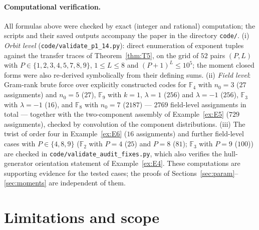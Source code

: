 \documentclass[10pt,journal,draftclsnofoot,onecolumn]{IEEEtran}
\theoremstyle{definition}
\theoremstyle{remark}
\begin{document}
\paragraph{Computational verification.}
All formulas above were checked by exact (integer and rational)
computation; the scripts and their saved outputs accompany the paper in
the directory \texttt{code/}. (i) \emph{Orbit level}
(\texttt{code/validate\_p1\_14.py}): direct enumeration of exponent
tuples against the transfer traces of Theorem~\ref{thm:T5}, on the grid
of \(52\) pairs \((P,L)\) with \(P \in \{1,2,3,4,5,7,8,9\}\),
\(1 \le L \le 8\) and \((P+1)^L \le 10^5\); the moment closed forms were
also re-derived symbolically from their defining sums. (ii) \emph{Field
level}: Gram-rank brute force over explicitly constructed codes for
\(\mathbb{F}_4\) with \(n_0 = 3\) (\(27\) assignments) and \(n_0 = 5\)
(\(27\)), \(\mathbb{F}_9\) with \(k = 1\), \(\lambda = 1\) (\(256\)) and
\(\lambda = -1\) (\(256\)), \(\mathbb{F}_3\) with \(\lambda = -1\)
(\(16\)), and \(\mathbb{F}_8\) with \(n_0 = 7\) (\(2187\)) ---
\(2769\) field-level assignments in total --- together with the
two-component assembly of Example~\ref{ex:E5} (\(729\) assignments),
checked by convolution of the component distributions. (iii) The twist
of order four in Example~\ref{ex:E6} (\(16\) assignments) and further
field-level cases with \(P \in \{4, 8, 9\}\) (\(\mathbb{F}_2\) with
\(P = 4\) (\(25\)) and \(P = 8\) (\(81\)); \(\mathbb{F}_3\) with
\(P = 9\) (\(100\))) are checked in
\texttt{code/validate\_audit\_fixes.py}, which also verifies the
hull-generator orientation statement of Example~\ref{ex:E4}. These computations are supporting evidence for the
tested cases; the proofs of
Sections~\ref{sec:param}--\ref{sec:moments} are independent of them.

\section{Limitations and scope}\label{sec:limitations}
\end{document}
